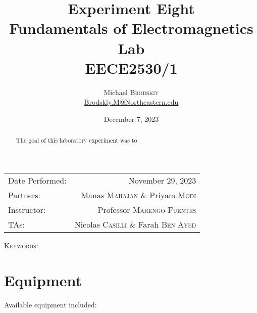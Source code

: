 \documentclass[
	letterpaper, %
	10pt, %
]{CSUniSchoolLabReport}
\title{Experiment Eight\\ Fundamentals of Electromagnetics Lab \\ EECE2530/1} %
\author{Michael \textsc{Brodskiy}\\ \small \href{mailto:Brodskiy.M@Northeastern.edu}{Brodskiy.M@Northeastern.edu}}
\date{December 7, 2023} %
\begin{document}
\maketitle %

\begin{center}
	\begin{tabular}{l r}
		Date Performed: & November 29, 2023 \\ %
        Partners: & Manas \textsc{Mahajan} \& Priyam \textsc{Modi} \\ %
		Instructor: & Professor \textsc{Marengo-Fuentes} \\ %
        TAs: & Nicolas \textsc{Casilli} \& Farah \textsc{Ben Ayed} \\ %
	\end{tabular}
\end{center}

\newpage

\begin{abstract}

  The goal of this laboratory experiment was to 

\end{abstract}

\begin{flushleft}

  \textsc{Keywords:} 

\end{flushleft}

\newpage

\section{Equipment}

\hspace{.5 in} Available equipment included:\\
\end{document}
